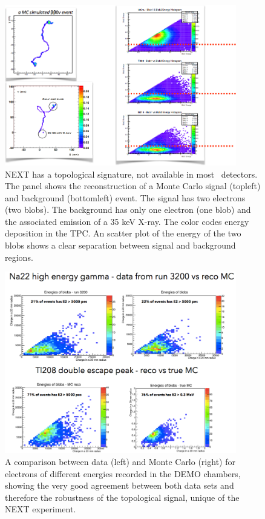 \begin{figure}
\centering
\includegraphics[width=0.9\textwidth]{img/Topology.png}
\caption{\small NEXT has a topological signature, not available in most \bbonu\ detectors. The panel shows the reconstruction of a Monte Carlo signal (topleft) and background (bottomleft) event. The signal has two electrons (two blobs). The background has only one electron (one blob) and the associated emission of a 35 keV X-ray. The color codes energy deposition in the TPC. An scatter plot of the energy of the two blobs shows a clear separation between signal and background regions.}\label{fig.ETRK2}
\end{figure}

\begin{figure}
\centering
\includegraphics[width=0.9\textwidth]{img/ElectronsDataMC.png}
\caption{\small A comparison between data (left) and Monte Carlo (right) for electrons of different energies recorded in the DEMO chambers, showing the very good agreement between both data sets and therefore the robustness of the topological signal, unique of the NEXT experiment.}\label{fig.ETRK3}
\end{figure}


